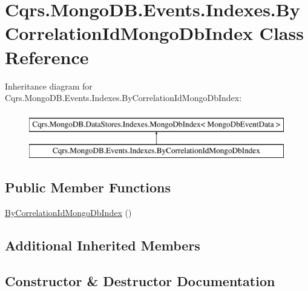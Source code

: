 \hypertarget{classCqrs_1_1MongoDB_1_1Events_1_1Indexes_1_1ByCorrelationIdMongoDbIndex}{}\section{Cqrs.\+Mongo\+D\+B.\+Events.\+Indexes.\+By\+Correlation\+Id\+Mongo\+Db\+Index Class Reference}
\label{classCqrs_1_1MongoDB_1_1Events_1_1Indexes_1_1ByCorrelationIdMongoDbIndex}
Inheritance diagram for Cqrs.\+Mongo\+D\+B.\+Events.\+Indexes.\+By\+Correlation\+Id\+Mongo\+Db\+Index\+:\begin{figure}[H]
\begin{center}
\leavevmode
\includegraphics[height=2.000000cm]{classCqrs_1_1MongoDB_1_1Events_1_1Indexes_1_1ByCorrelationIdMongoDbIndex}
\end{center}
\end{figure}
\subsection*{Public Member Functions}
\begin{DoxyCompactItemize}
\item 
\hyperlink{classCqrs_1_1MongoDB_1_1Events_1_1Indexes_1_1ByCorrelationIdMongoDbIndex_a7bfea0225205a97ffd3501ba5032b5b3_a7bfea0225205a97ffd3501ba5032b5b3}{By\+Correlation\+Id\+Mongo\+Db\+Index} ()
\end{DoxyCompactItemize}
\subsection*{Additional Inherited Members}


\subsection{Constructor \& Destructor Documentation}
\mbox{\label{classCqrs_1_1MongoDB_1_1Events_1_1Indexes_1_1ByCorrelationIdMongoDbIndex_a7bfea0225205a97ffd3501ba5032b5b3_a7bfea0225205a97ffd3501ba5032b5b3}} 
